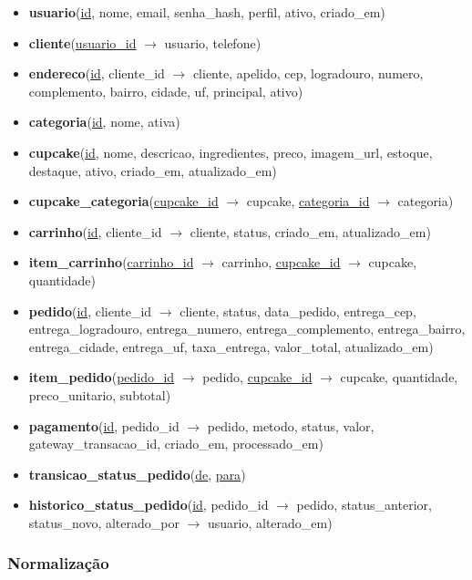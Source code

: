 \documentclass[12pt]{article}
\begin{document}
\begin{small}
\begin{itemize}
\item \textbf{usuario}(\underline{id}, nome, email, senha\_hash, perfil, ativo, criado\_em)
\item \textbf{cliente}(\underline{usuario\_id} $\rightarrow$ usuario, telefone)
\item \textbf{endereco}(\underline{id}, cliente\_id $\rightarrow$ cliente, apelido, cep, logradouro, numero, complemento, bairro, cidade, uf, principal, ativo)
\item \textbf{categoria}(\underline{id}, nome, ativa)
\item \textbf{cupcake}(\underline{id}, nome, descricao, ingredientes, preco, imagem\_url, estoque, destaque, ativo, criado\_em, atualizado\_em)
\item \textbf{cupcake\_categoria}(\underline{cupcake\_id} $\rightarrow$ cupcake, \underline{categoria\_id} $\rightarrow$ categoria)
\item \textbf{carrinho}(\underline{id}, cliente\_id $\rightarrow$ cliente, status, criado\_em, atualizado\_em)
\item \textbf{item\_carrinho}(\underline{carrinho\_id} $\rightarrow$ carrinho, \underline{cupcake\_id} $\rightarrow$ cupcake, quantidade)
\item \textbf{pedido}(\underline{id}, cliente\_id $\rightarrow$ cliente, status, data\_pedido, entrega\_cep, entrega\_logradouro, entrega\_numero, entrega\_complemento, entrega\_bairro, entrega\_cidade, entrega\_uf, taxa\_entrega, valor\_total, atualizado\_em)
\item \textbf{item\_pedido}(\underline{pedido\_id} $\rightarrow$ pedido, \underline{cupcake\_id} $\rightarrow$ cupcake, quantidade, preco\_unitario, subtotal)
\item \textbf{pagamento}(\underline{id}, pedido\_id $\rightarrow$ pedido, metodo, status, valor, gateway\_transacao\_id, criado\_em, processado\_em)
\item \textbf{transicao\_status\_pedido}(\underline{de}, \underline{para})
\item \textbf{historico\_status\_pedido}(\underline{id}, pedido\_id $\rightarrow$ pedido, status\_anterior, status\_novo, alterado\_por $\rightarrow$ usuario, alterado\_em)
\end{itemize}
\end{small}

\subsubsection{Normalização}
\end{document}
